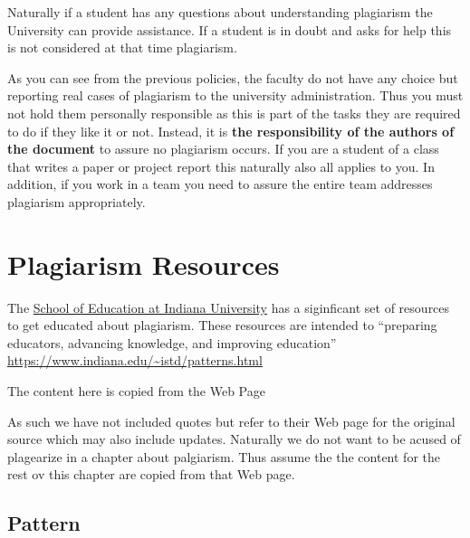 Naturally if a student has any questions about understanding
plagiarism the University can provide assistance. If a student is in
doubt and asks for help this is not considered at that time
plagiarism. 

As you can see from the previous policies, the faculty do not have any
choice but reporting real cases of plagiarism to the university
administration.  Thus you must not hold them personally responsible as
this is part of the tasks they are required to do if they like it or
not. Instead, it is {\bf the responsibility of the authors of the
  document} to assure no plagiarism occurs. If you are a student of a
class that writes a paper or project report this naturally also all
applies to you. In addition, if you work in a team you need to assure
the entire team addresses plagiarism appropriately.

\section{Plagiarism Resources}

The \href{http://education.indiana.edu/}{School of Education at Indiana
University} has a siginficant set of resources to get educated about
plagiarism. These resources are intended to ``preparing educators,
advancing knowledge, and improving education'' \cite{}
\url{https://www.indiana.edu/~istd/patterns.html}

The content here is copied from the Web Page


As such we have not included quotes but refer to their Web page for the
original source which may also include updates. Naturally we do not want
to be acused of plagearize in a chapter about palgiarism.  Thus assume
the the content for the rest ov this chapter are copied from that Web page.

\subsection{Pattern}\label{pattern}

